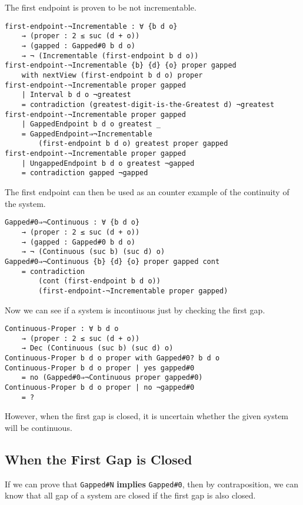 \documentclass[\main/thesis.tex]{subfiles}
\begin{document}
The first endpoint is proven to be not incrementable.

\begin{lstlisting}
first-endpoint-¬Incrementable : ∀ {b d o}
    → (proper : 2 ≤ suc (d + o))
    → (gapped : Gapped#0 b d o)
    → ¬ (Incrementable (first-endpoint b d o))
first-endpoint-¬Incrementable {b} {d} {o} proper gapped
    with nextView (first-endpoint b d o) proper
first-endpoint-¬Incrementable proper gapped
    | Interval b d o ¬greatest
    = contradiction (greatest-digit-is-the-Greatest d) ¬greatest
first-endpoint-¬Incrementable proper gapped
    | GappedEndpoint b d o greatest _
    = GappedEndpoint⇒¬Incrementable
        (first-endpoint b d o) greatest proper gapped
first-endpoint-¬Incrementable proper gapped
    | UngappedEndpoint b d o greatest ¬gapped
    = contradiction gapped ¬gapped
\end{lstlisting}

The first endpoint can then be used as an counter example of the continuity of
the system.

\begin{lstlisting}
Gapped#0⇒¬Continuous : ∀ {b d o}
    → (proper : 2 ≤ suc (d + o))
    → (gapped : Gapped#0 b d o)
    → ¬ (Continuous (suc b) (suc d) o)
Gapped#0⇒¬Continuous {b} {d} {o} proper gapped cont
    = contradiction
        (cont (first-endpoint b d o))
        (first-endpoint-¬Incrementable proper gapped)
\end{lstlisting}

Now we can see if a system is incontiuous just by checking the first gap.

\begin{lstlisting}
Continuous-Proper : ∀ b d o
    → (proper : 2 ≤ suc (d + o))
    → Dec (Continuous (suc b) (suc d) o)
Continuous-Proper b d o proper with Gapped#0? b d o
Continuous-Proper b d o proper | yes gapped#0
    = no (Gapped#0⇒¬Continuous proper gapped#0)
Continuous-Proper b d o proper | no ¬gapped#0
    = ?
\end{lstlisting}

However, when the first gap is closed, it is uncertain whether the given system
will be continuous.

\subsection{When the First Gap is Closed}

If we can prove that \lstinline|Gapped#N| \textbf{implies} \lstinline|Gapped#0|,
then by contraposition, we can know that all gap of a system are closed if the
first gap is also closed.
\end{document}
